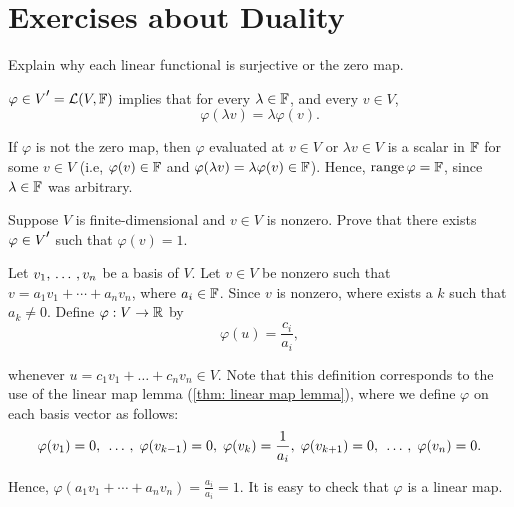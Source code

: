 \section*{Exercises about Duality}


\begin{xrcs}
  Explain why each linear functional is surjective or the zero map.
  \begin{xsol}
    $\varphi \in \dual{V} = \lin{V}{\myF}$ implies that for every $\lambda \in \mathbb{F}$, and every $v \in V$,
    \begin{equation}
      \varphi (\lambda v) = \lambda \varphi(v).
    \end{equation}

    If $\varphi$ is not the zero map, then $\varphi$ evaluated at $v \in V$ or $\lambda v \in V$ is a scalar in  $\mathbb{F}$ for some $v \in V$ (i.e, $\varphi(v) \in \mathbb{F}$ and $ \varphi(\lambda v) = \lambda \varphi(v) \in \mathbb{F}$). Hence, $\operatorname{range} \varphi = \mathbb{F}$, since $\lambda  \in \mathbb{F}$ was arbitrary.
  \end{xsol}
\end{xrcs}

\begin{xrcs}
  Suppose $V$ is finite-dimensional and $v \in V$ is nonzero. Prove that there exists $\varphi \in \dual{V}$ such that $\varphi(v) = 1$.
  \begin{xsol}
    Let $v_1, {\, \ldots \,\,}, v_n$ be a basis of $V$. Let $v \in V$ be nonzero such that $v = a_1 v_1 + \cdots + a_n v_n$, where $a_i \in \mathbb{F}$. Since $v$ is nonzero, where exists a $k$ such that $a_k \neq 0$. Define $\varphi: V \to \mathbb{R}$ by
    \begin{equation}
      \varphi (u) = \frac{c_i}{a_i},
    \end{equation}

    whenever $u = c_1 v_1 + \dots + c_n v_n \in V$. Note that this definition corresponds to the use of the linear map lemma (\ref{thm: linear map lemma}), where we define $\varphi$ on each basis vector as follows:
    \begin{equation}
      \varphi (v_1) = 0, \;  {\, \ldots \,\,}, \;
      \varphi(v_{k-1}) = 0, \;
      \varphi(v_k) = \frac{1}{a_i}, \;
      \varphi(v_{k+1}) = 0, \;  {\, \ldots \,\,}, \;
      \varphi(v_n) = 0.
    \end{equation}

    Hence, $\varphi(a_1 v_1 + \cdots + a_n v_n) = \frac{a_i}{a_i} = 1$. It is easy to check that $\varphi$ is a linear map.
  \end{xsol}
\end{xrcs}

